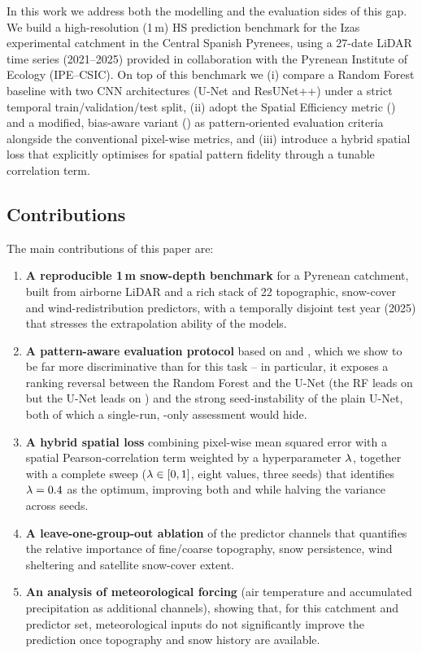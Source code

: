 In this work we address both the modelling and the evaluation sides of this
gap. We build a high-resolution (1\,m) HS prediction benchmark for the Izas
experimental catchment in the Central Spanish Pyrenees, using a 27-date LiDAR
time series (2021--2025) provided in collaboration with the Pyrenean
Institute of Ecology (IPE--CSIC). On top of this benchmark we (i) compare a
Random Forest baseline with two CNN architectures (U-Net and ResUNet++) under
a strict temporal train/validation/test split, (ii) adopt the Spatial
Efficiency metric (\SPAEF{}) and a modified, bias-aware variant (\MSPAEF{}) as
pattern-oriented evaluation criteria alongside the conventional pixel-wise
metrics, and (iii) introduce a hybrid spatial loss that explicitly optimises
for spatial pattern fidelity through a tunable correlation term.

\subsection{Contributions}
\label{subsec:contributions}

The main contributions of this paper are:

\begin{enumerate}
  \item \textbf{A reproducible 1\,m snow-depth benchmark} for a Pyrenean
  catchment, built from airborne LiDAR and a rich stack of 22 topographic,
  snow-cover and wind-redistribution predictors, with a temporally
  disjoint test year (2025) that stresses the extrapolation ability of the
  models.

  \item \textbf{A pattern-aware evaluation protocol} based on \SPAEF{} and
  \MSPAEF{}, which we show to be far more discriminative than \Rsq{} for this
  task -- in particular, it exposes a ranking reversal between the Random Forest
  and the U-Net (the RF leads on \Rsq{} but the U-Net leads on \SPAEF{}) and the
  strong seed-instability of the plain U-Net, both of which a single-run,
  \Rsq{}-only assessment would hide.

  \item \textbf{A hybrid spatial loss} combining pixel-wise mean squared error
  with a spatial Pearson-correlation term weighted by a hyperparameter
  $\lambda$, together with a complete sweep ($\lambda\in[0,1]$, eight values,
  three seeds) that identifies $\lambda=0.4$ as the optimum, improving both
  \Rsq{} and \SPAEF{} while halving the variance across seeds.

  \item \textbf{A leave-one-group-out ablation} of the predictor channels that
  quantifies the relative importance of fine/coarse topography, snow
  persistence, wind sheltering and satellite snow-cover extent.

  \item \textbf{An analysis of meteorological forcing} (air temperature and
  accumulated precipitation as additional channels), showing that, for this
  catchment and predictor set, meteorological inputs do not significantly
  improve the prediction once topography and snow history are available.
\end{enumerate}

